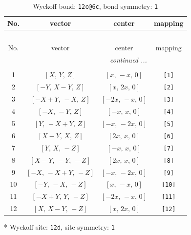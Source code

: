 \documentclass[fleqn,8pt]{jsarticle}
\begin{document}
\begin{longtable}{cccc}
\caption{Wyckoff bond: {\tt 12c@6c}, bond symmetry: {\tt 1}}
 \\
 \hline \hline
No. & vector & center & mapping \\ \hline \endfirsthead

\multicolumn{3}{l}{\tablename\ \thetable{}} \\
 \hline \hline
No. & vector & center & mapping \\ \hline \endhead

 \hline \hline
\multicolumn{3}{r}{\footnotesize\it continued ...} \\ \endfoot

 \hline \hline
\multicolumn{3}{r}{} \\ \endlastfoot

1 & $\left[ X,\, Y,\, Z \right]$ & $\left[ x,\, - x,\, 0 \right]$ & {\tt [1]} \\ \hline
2 & $\left[ - Y,\, X - Y,\, Z \right]$ & $\left[ x,\, 2 x,\, 0 \right]$ & {\tt [2]} \\ \hline
3 & $\left[ - X + Y,\, - X,\, Z \right]$ & $\left[ - 2 x,\, - x,\, 0 \right]$ & {\tt [3]} \\ \hline
4 & $\left[ - X,\, - Y,\, Z \right]$ & $\left[ - x,\, x,\, 0 \right]$ & {\tt [4]} \\ \hline
5 & $\left[ Y,\, - X + Y,\, Z \right]$ & $\left[ - x,\, - 2 x,\, 0 \right]$ & {\tt [5]} \\ \hline
6 & $\left[ X - Y,\, X,\, Z \right]$ & $\left[ 2 x,\, x,\, 0 \right]$ & {\tt [6]} \\ \hline
7 & $\left[ Y,\, X,\, - Z \right]$ & $\left[ - x,\, x,\, 0 \right]$ & {\tt [7]} \\ \hline
8 & $\left[ X - Y,\, - Y,\, - Z \right]$ & $\left[ 2 x,\, x,\, 0 \right]$ & {\tt [8]} \\ \hline
9 & $\left[ - X,\, - X + Y,\, - Z \right]$ & $\left[ - x,\, - 2 x,\, 0 \right]$ & {\tt [9]} \\ \hline
10 & $\left[ - Y,\, - X,\, - Z \right]$ & $\left[ x,\, - x,\, 0 \right]$ & {\tt [10]} \\ \hline
11 & $\left[ - X + Y,\, Y,\, - Z \right]$ & $\left[ - 2 x,\, - x,\, 0 \right]$ & {\tt [11]} \\ \hline
12 & $\left[ X,\, X - Y,\, - Z \right]$ & $\left[ x,\, 2 x,\, 0 \right]$ & {\tt [12]} \\
\end{longtable}
* Wyckoff site: {\tt 12d}, site symmetry: {\tt 1}
\renewcommand{\arraystretch}{1.2}
\end{document}

